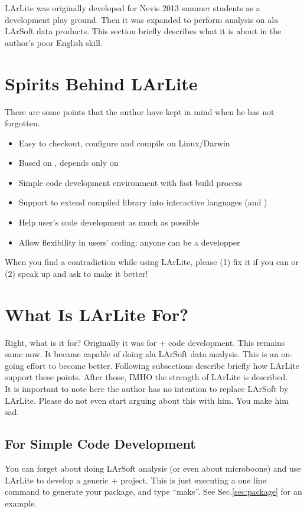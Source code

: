 
LArLite was originally developed for Nevis 2013 summer students as a \CPP development play ground.
Then it was expanded to perform analysis on ala LArSoft data products. 
This section briefly describes what it is about in the author's poor English skill.

\section{Spirits Behind LArLite}
There are some points that the author have kept in mind when he has not forgotten.
\begin{itemize}
\item Easy to checkout, configure and compile on Linux/Darwin
\item Based on \CPP, depends only on \ROOT
\item Simple code development environment with fast build process
\item Support to extend compiled library into interactive languages (\python and \CINT)
\item Help user's code development as much as possible
\item Allow flexibility in users' coding: anyone can be a developper
\end{itemize}
When you find a contradiction while using LArLite, please (1) fix it if you can or (2) speak up and ask to make it better! 

\section{What Is LArLite For?}
Right, what is it for?
Originally it was for \CPP + \ROOT code development. This remains same now.
It became capable of doing ala LArSoft data analysis. This is an on-going effort to become better.
Following subsections describe briefly how LArLite support these points.
After those, IMHO the strength of LArLite is described.\\

It is important to note here the author has no intention to replace LArSoft by LArLite. 
Please do not even start arguing about this with him. You make him sad.

\subsection{For Simple \CPP Code Development}
You can forget about doing LArSoft analysis (or even about microboone) and use LArLite to develop a generic \CPP + \ROOT project. This is just executing a one line command to generate your package, and type ``make''. See Sec.\ref{sec:package} for an example.

